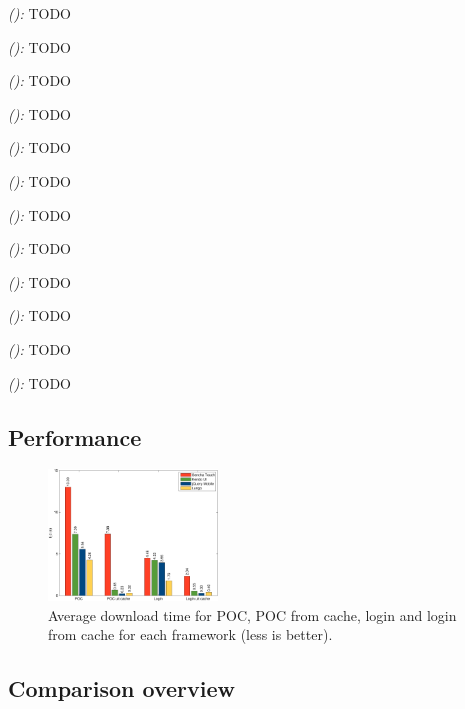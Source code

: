 \documentclass[a4paper]{artikel3}
\newcommand{\framework}[2]{ \emph{#1 (\textbf{#2}): }} %
\begin{document}
\framework{\sta{}}{}
TODO

\framework{\kendoa{}}{}
TODO

\framework{\jqma{}}{}
TODO

\framework{\lungoa{}}{}
TODO


\framework{\sta{}}{}
TODO

\framework{\kendoa{}}{}
TODO

\framework{\jqma{}}{}
TODO

\framework{\lungoa{}}{}
TODO


\framework{\sta{}}{}
TODO

\framework{\kendoa{}}{}
TODO

\framework{\jqma{}}{}
TODO

\framework{\lungoa{}}{}
TODO
  

\subsection{Performance} %
\label{sec:evaluation-performance}

\begin{figure}
  \centering
  \includegraphics[width=0.4\textwidth]{../Masterproef/figuren/performance.pdf}
  \caption{Average download time for POC,  POC from cache,  login and login from cache for each framework (less is better).}
  \label{fig:performance}
\end{figure}


\subsection{Comparison overview} %
\label{sec:evaluation-overview}
\end{document}
